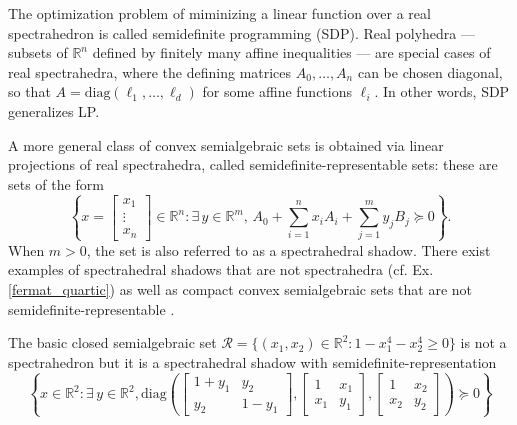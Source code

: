 \documentclass{elsarticle}
\theoremstyle{plain}
\theoremstyle{definition}
\newcommand{\R}{\mathbb{R}} %
\def\diag{\mathrm{diag}}
\begin{document}
The optimization problem of miminizing a linear function over a real spectrahedron
is called {semidefinite programming} (SDP).
{Real polyhedra} --- subsets of $\R^n$ defined by finitely many affine inequalities --- are special cases of real
spectrahedra, where the defining matrices $A_0, \ldots, A_n$ can be chosen diagonal, so that
$A = \diag(\ell_1,\ldots, \ell_d)$ for some affine functions $\ell_i$. In other words, SDP generalizes LP.

A more general class of convex semialgebraic sets is obtained via linear projections of real spectrahedra,
called semidefinite-re\-pre\-sen\-ta\-ble sets: these are sets of the form
$$
\left\{x = \left[\begin{smallmatrix} x_1 \\ \vdots \\ x_n \end{smallmatrix}\right] \in \R^n : \exists\,y\in\R^m, \, A_0 + \sum_{i=1}^n x_i A_i + \sum_{j=1}^m y_j B_j \succeq 0\right\}.
$$
When $m>0$, the set is also referred to as a spectrahedral shadow. There exist examples of
spectrahedral shadows that are not spectrahedra (cf. Ex. \ref{fermat_quartic}) as well as compact
convex semialgebraic sets that are not semidefinite-representable \cite{scheiderer_spectrahedral_2017}.

\begin{example}
\label{fermat_quartic}
The basic closed semialgebraic set $\mathcal{R} = \{(x_1,x_2) \in \R^2 : 1-x_1^4-x_2^4 \geq 0\}$ is not a spectrahedron but it is a spectrahedral shadow with semidefinite-representation
$$
\left\{x \in \R^2 :
\exists\, y \in \R^2,
\diag\left(
\left[
\begin{smallmatrix}
  1+y_1 & y_2 \\
  y_2 & 1-y_1
\end{smallmatrix}
\right],
\left[
\begin{smallmatrix}
  1 & x_1 \\
  x_1 & y_1
\end{smallmatrix}
\right],
\left[
\begin{smallmatrix}
  1 & x_2 \\
  x_2 & y_2
\end{smallmatrix}
\right]
\right)
\succeq 0
\right\}
$$
\end{example}
\end{document}
